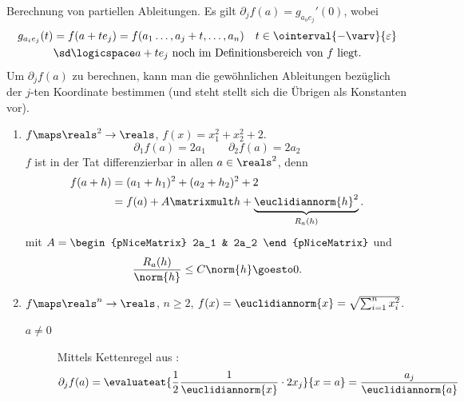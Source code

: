 \begin{bemerkung}
    Berechnung von partiellen Ableitungen. Es gilt \( \partial_j f(a)=g_{a_o e_j}'(0) \), wobei
    \begin{multline*}
        g_{a_i e_j}(t)=f(a+t e_j)=f(a_1\dotsc, a_j+t, \dotsc,a_n)\quad t\in \ointerval{-\varv}{\varepsilon} \\\text{\sd} \logicspace  a+te_{j} \ \text{noch im Definitionsbereich von \( f \) liegt.}
    \end{multline*}
    \timplies Um \( \partial_j f(a) \) zu berechnen, kann man die gewöhnlichen Ableitungen bezüglich der \( j \)-ten Koordinate bestimmen (und steht stellt sich die Übrigen als Konstanten vor).
\end{bemerkung}
\begin{beispiele}
    \begin{enumerate}
        \item \( f\maps \reals^2\to \reals \), \( f(x)=x_1^2+x_2^2+2 \).
        \begin{equation*}
            \partial_1 f(a)=2a_1\qquad \partial_2 f(a)=2a_2
        \end{equation*}
        \( f \) ist in der Tat differenzierbar in allen \( a\in \reals^2 \), denn
        \begin{equation*}
            \begin{split}
                f(a+h)&=(a_1+h_1)^2+(a_2+h_2)^2+2\\
                &=f(a)+A\matrixmult h+\underbrace{\euclidiannorm{h}^2}_{R_a(h)}.
            \end{split}
        \end{equation*}
        mit \( A=\begin{pNiceMatrix} 2a_1 & 2a_2 \end{pNiceMatrix} \) und
        \begin{align*}
            \frac{R_a(h)}{\norm{h}}\leq C\norm{h}\goesto 0.
        \end{align*}
        \item \( f\maps \reals^n \to \reals\), \( n\geq 2 \), \( f(x)=\euclidiannorm{x}=\sqrt{\sum_{i=1}^{n}x_i^2} \).
        \begin{description}
            \item[\( a\neq 0 \)] Mittels Kettenregel aus :
            \begin{align*}
                \partial_j f(a)=\evaluateat{\frac{1}{2}\frac{1}{\euclidiannorm{x}}\cdot 2x_j}{x=a}=\frac{a_j}{\euclidiannorm{a}}
            \end{align*}

\end{description}
\end{enumerate}
\end{beispiele}
